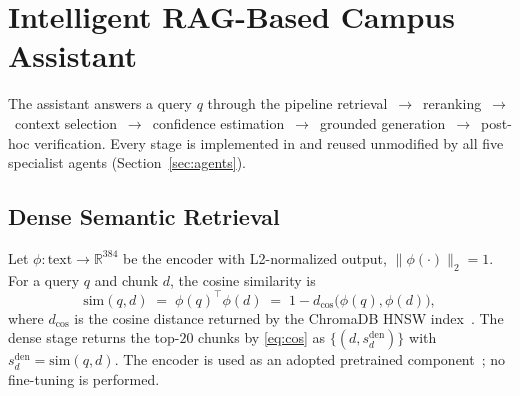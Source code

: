 \section{Intelligent RAG-Based Campus Assistant}
\label{sec:rag}



The assistant answers a query $q$ through the pipeline
retrieval~$\to$~reranking~$\to$~context selection~$\to$~confidence
estimation~$\to$~grounded generation~$\to$~post-hoc verification. Every
stage is implemented in  and reused unmodified by all
five specialist agents (Section~\ref{sec:agents}).

\subsection{Dense Semantic Retrieval}
Let $\phi:\text{text}\to\mathbb{R}^{384}$ be the 
encoder with L2-normalized output, $\|\phi(\cdot)\|_2 = 1$. For a query
$q$ and chunk $d$, the cosine similarity is
\begin{equation}
\mathrm{sim}(q,d) \;=\; \phi(q)^{\!\top}\phi(d)
\;=\; 1 - d_{\cos}\big(\phi(q),\phi(d)\big),
\label{eq:cos}
\end{equation}
where $d_{\cos}$ is the cosine distance returned by the ChromaDB HNSW
index~\cite{malkov2020hnsw}. The dense stage returns the top-$20$ chunks by
\eqref{eq:cos} as $\{(d, s^{\mathrm{den}}_d)\}$ with
$s^{\mathrm{den}}_d = \mathrm{sim}(q,d)$. The encoder is used as an adopted
pretrained component~\cite{reimers2019sbert,wang2020minilm}; no fine-tuning
is performed.

